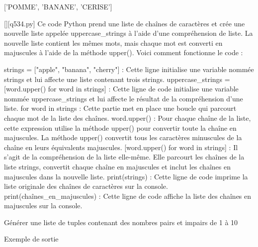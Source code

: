 ['POMME', 'BANANE', 'CERISE']
        \par
        \begin{solution}
            \renewcommand{\nomfichier}{q534.py}
            \pythonfile{\chemincode \nomfichier}[][\nomfichier]
            Ce code Python prend une liste de chaînes de caractères et crée une nouvelle liste appelée uppercase\_strings à l'aide d'une compréhension de liste. La nouvelle liste contient les mêmes mots, mais chaque mot est converti en majuscules à l'aide de la méthode upper(). Voici comment fonctionne le code :

    strings = ["apple", "banana", "cherry"] : Cette ligne initialise une variable nommée strings et lui affecte une liste contenant trois strings.
    uppercase\_strings = [word.upper() for word in strings] : Cette ligne de code initialise une variable nommée uppercase\_strings et lui affecte le résultat de la compréhension d'une liste.
        for word in strings : Cette partie met en place une boucle qui parcourt chaque mot de la liste des chaînes.
        word.upper() : Pour chaque chaîne de la liste, cette expression utilise la méthode upper() pour convertir toute la chaîne en majuscules. La méthode upper() convertit tous les caractères minuscules de la chaîne en leurs équivalents majuscules.
        [word.upper() for word in strings] : Il s'agit de la compréhension de la liste elle-même. Elle parcourt les chaînes de la liste strings, convertit chaque chaîne en majuscules et inclut les chaînes en majuscules dans la nouvelle liste.
    print(strings) : Cette ligne de code imprime la liste originale des chaînes de caractères sur la console.
    print(chaînes\_en\_majuscules) : Cette ligne de code affiche la liste des chaînes en majuscules sur la console.
        \end{solution}
        

        \question
        Générer une liste de tuples contenant des nombres pairs et impairs de 1 à 10

Exemple de sortie

